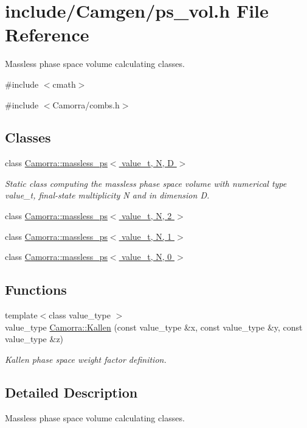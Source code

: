 \hypertarget{a00619}{
\section{include/Camgen/ps\_\-vol.h File Reference}
\label{a00619}
}


Massless phase space volume calculating classes.  


{\ttfamily \#include $<$cmath$>$}\par
{\ttfamily \#include $<$Camorra/combs.h$>$}\par
\subsection*{Classes}
\begin{DoxyCompactItemize}
\item 
class \hyperlink{a00353}{Camorra::massless\_\-ps$<$ value\_\-t, N, D $>$}
\begin{DoxyCompactList}\small\item\em Static class computing the massless phase space volume with numerical type value\_\-t, final-\/state multiplicity N and in dimension D. \end{DoxyCompactList}\item 
class \hyperlink{a00356}{Camorra::massless\_\-ps$<$ value\_\-t, N, 2 $>$}
\item 
class \hyperlink{a00355}{Camorra::massless\_\-ps$<$ value\_\-t, N, 1 $>$}
\item 
class \hyperlink{a00354}{Camorra::massless\_\-ps$<$ value\_\-t, N, 0 $>$}
\end{DoxyCompactItemize}
\subsection*{Functions}
\begin{DoxyCompactItemize}
\item 
\hypertarget{a00831_afe383962b5cdcd4eeb55816e3cc4c8dd}{
{\footnotesize template$<$class value\_\-type $>$ }\\value\_\-type \hyperlink{a00831_afe383962b5cdcd4eeb55816e3cc4c8dd}{Camorra::Kallen} (const value\_\-type \&x, const value\_\-type \&y, const value\_\-type \&z)}
\label{a00831_afe383962b5cdcd4eeb55816e3cc4c8dd}

\begin{DoxyCompactList}\small\item\em Kallen phase space weight factor definition. \end{DoxyCompactList}\end{DoxyCompactItemize}


\subsection{Detailed Description}
Massless phase space volume calculating classes. 